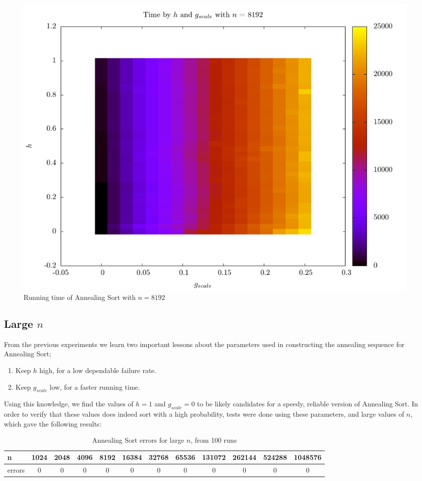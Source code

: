 \begin{figure}
\center
\includegraphics[width=\textwidth]{graphs/Annealing/annealing8192time.pdf}
\caption{Running time of Annealing Sort with $n = 8192$}
\label{fig:Annealing:time8192}
\end{figure}

\subsection{Large $n$}

From the previous experiments we learn two important lessons about the parameters used in constructing the annealing sequence for Annealing Sort;

\begin{enumerate}
\item Keep $h$ high, for a low dependable failure rate.
\item Keep $g_{scale}$ low, for a faster running time.
\end{enumerate}

Using this knowledge, we find the values of $h = 1$ and $g_{scale} = 0$ to be likely candidates for a speedy, reliable version of Annealing Sort.
In order to verify that these values does indeed sort with a high probability, tests were done using these parameters, and large values of $n$, which gave the following results:

\begin{table}[!ht]
\begin{adjustwidth}{-.5in}{-.5in}
\centering
\begin{tabular}{|l|c|c|c|c|c|c|c|c|c|c|c|}
\hline
n      & 1024 & 2048 & 4096 & 8192 & 16384 & 32768 & 65536 & 131072 & 262144 & 524288 & 1048576 \\ \hline
errors & 0    & 0    & 0    & 0    & 0     & 0     & 0     & 0      & 0      & 0      & 0       \\ \hline
\end{tabular}
\caption{Annealing Sort errors for large $n$, from 100 runs}
\end{adjustwidth}
\end{table}

